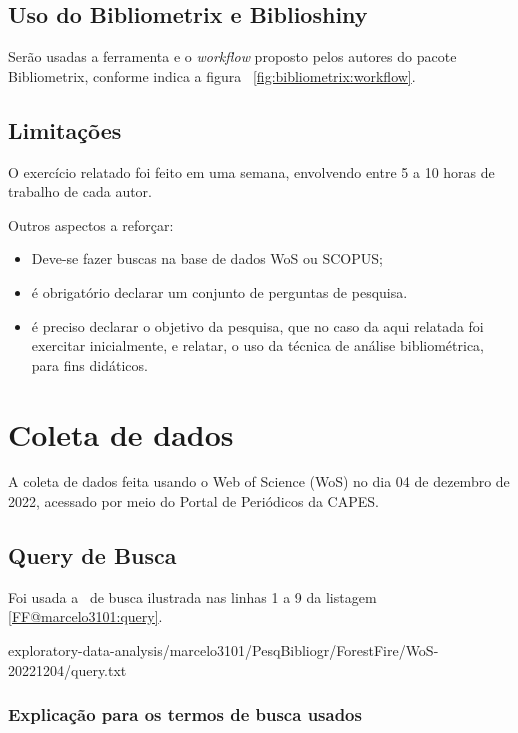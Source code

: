 \subsection{Uso do Bibliometrix e Biblioshiny}
Serão usadas a ferramenta e o \textit{workflow} proposto pelos autores do pacote Bibliometrix, conforme indica a figura ~\ref{fig:bibliometrix:workflow}.

\subsection{Limitações} O exercício relatado foi feito em uma semana, envolvendo entre 5 a 10 horas de trabalho de cada autor.

Outros aspectos a reforçar:
\begin{itemize}
   
\item Deve-se fazer buscas na base de dados WoS ou SCOPUS;
\item é obrigatório declarar um conjunto de perguntas de pesquisa.
\item é preciso declarar o objetivo da pesquisa, que no caso da aqui relatada foi exercitar inicialmente, e relatar, o uso da técnica de análise bibliométrica, para fins didáticos.
\end{itemize}


\section{Coleta de dados\label{FF@marcelo3101:coleta}}

A coleta de dados feita usando o Web of Science (WoS) no dia 04 de dezembro de 2022, acessado por meio do Portal de Periódicos da CAPES.


\subsection{Query de Busca}

Foi usada a \query\  de busca ilustrada nas linhas 1 a 9 da listagem \ref{FF@marcelo3101:query}.


{exploratory-data-analysis/marcelo3101/PesqBibliogr/ForestFire/WoS-20221204/query.txt}

\subsubsection{Explicação para os termos de busca usados\label{MASSA:query}}

